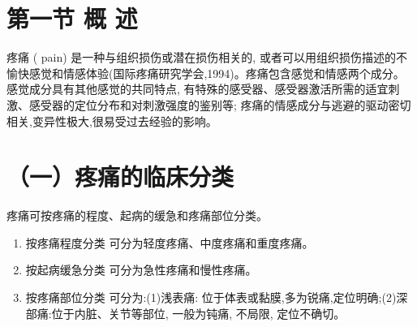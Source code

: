 \documentclass[10pt]{article}
\begin{document}
\section*{第一节 概 述}
疼痛 ( pain) 是一种与组织损伤或潜在损伤相关的, 或者可以用组织损伤描述的不愉快感觉和情感体验(国际疼痛研究学会,1994)。疼痛包含感觉和情感两个成分。感觉成分具有其他感觉的共同特点, 有特殊的感受器、感受器激活所需的适宜刺激、感受器的定位分布和对刺激强度的鉴别等; 疼痛的情感成分与逃避的驱动密切相关,变异性极大,很易受过去经验的影响。

\section*{（一）疼痛的临床分类}
疼痛可按疼痛的程度、起病的缓急和疼痛部位分类。

\begin{enumerate}
  \item 按疼痛程度分类 可分为轻度疼痛、中度疼痛和重度疼痛。

  \item 按起病缓急分类 可分为急性疼痛和慢性疼痛。

  \item 按疼痛部位分类 可分为:(1)浅表痛: 位于体表或黏膜,多为锐痛,定位明确;(2)深部痛:位于内脏、关节等部位, 一般为钝痛, 不局限, 定位不确切。

\end{enumerate}
\end{document}
